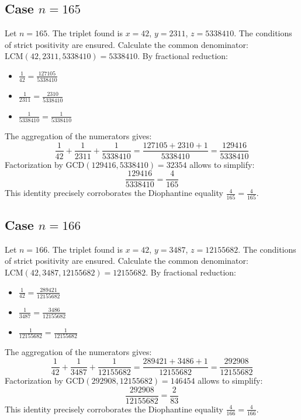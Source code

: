 \documentclass[11pt,a4paper]{article}
\begin{document}
\subsection{Case $n = 165$}
Let $n = 165$. The triplet found is $x = 42$, $y = 2311$, $z = 5338410$.
The conditions of strict positivity are ensured.
Calculate the common denominator: $\text{LCM}(42, 2311, 5338410) = 5338410$.
By fractional reduction:
\begin{itemize}
    \item $\frac{1}{42} = \frac{127105}{5338410}$
    \item $\frac{1}{2311} = \frac{2310}{5338410}$
    \item $\frac{1}{5338410} = \frac{1}{5338410}$
\end{itemize}
The aggregation of the numerators gives:
$$ \frac{1}{42} + \frac{1}{2311} + \frac{1}{5338410} = \frac{127105 + 2310 + 1}{5338410} = \frac{129416}{5338410} $$
Factorization by $\text{GCD}(129416, 5338410) = 32354$ allows to simplify:
$$ \frac{129416}{5338410} = \frac{4}{165} $$
This identity precisely corroborates the Diophantine equality $\frac{4}{165} = \frac{4}{165}$.

\subsection{Case $n = 166$}
Let $n = 166$. The triplet found is $x = 42$, $y = 3487$, $z = 12155682$.
The conditions of strict positivity are ensured.
Calculate the common denominator: $\text{LCM}(42, 3487, 12155682) = 12155682$.
By fractional reduction:
\begin{itemize}
    \item $\frac{1}{42} = \frac{289421}{12155682}$
    \item $\frac{1}{3487} = \frac{3486}{12155682}$
    \item $\frac{1}{12155682} = \frac{1}{12155682}$
\end{itemize}
The aggregation of the numerators gives:
$$ \frac{1}{42} + \frac{1}{3487} + \frac{1}{12155682} = \frac{289421 + 3486 + 1}{12155682} = \frac{292908}{12155682} $$
Factorization by $\text{GCD}(292908, 12155682) = 146454$ allows to simplify:
$$ \frac{292908}{12155682} = \frac{2}{83} $$
This identity precisely corroborates the Diophantine equality $\frac{4}{166} = \frac{4}{166}$.
\end{document}
